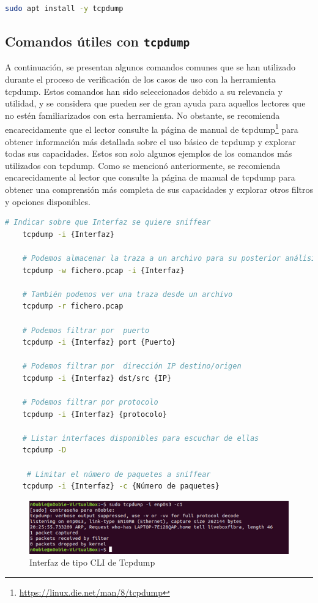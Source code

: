\begin{lstlisting}[language= bash, style=Consola2, caption={Instalación del paquete Tcpdump},label=code:tcpdump]
    sudo apt install -y tcpdump
\end{lstlisting}

\subsection{Comandos útiles con \texttt{tcpdump}}


A continuación, se presentan algunos comandos comunes que se han utilizado durante el proceso de verificación de los casos de uso con la herramienta tcpdump. Estos comandos han sido seleccionados debido a su relevancia y utilidad, y se considera que pueden ser de gran ayuda para aquellos lectores que no estén familiarizados con esta herramienta. No obstante, se recomienda encarecidamente que el lector consulte la página de manual de tcpdump\footnote{\url{https://linux.die.net/man/8/tcpdump}} para obtener información más detallada sobre el uso básico de tcpdump y explorar todas sus capacidades. Estos son solo algunos ejemplos de los comandos más utilizados con tcpdump. Como se mencionó anteriormente, se recomienda encarecidamente al lector que consulte la página de manual de tcpdump para obtener una comprensión más completa de sus capacidades y explorar otros filtros y opciones disponibles.

\begin{lstlisting}[language= bash, style=Consola2, caption={Comandos útiles con Tcpdump},label=code:tcpdump_use]
    # Indicar sobre que Interfaz se quiere sniffear
    tcpdump -i {Interfaz}
    
    # Podemos almacenar la traza a un archivo para su posterior análisis
    tcpdump -w fichero.pcap -i {Interfaz}
    
    # También podemos ver una traza desde un archivo
    tcpdump -r fichero.pcap
    
    # Podemos filtrar por  puerto
    tcpdump -i {Interfaz} port {Puerto}
    
    # Podemos filtrar por  dirección IP destino/origen
    tcpdump -i {Interfaz} dst/src {IP}
    
    # Podemos filtrar por protocolo
    tcpdump -i {Interfaz} {protocolo}
    
    # Listar interfaces disponibles para escuchar de ellas 
    tcpdump -D
    
     # Limitar el número de paquetes a sniffear
    tcpdump -i {Interfaz} -c {Número de paquetes}
\end{lstlisting}
\vspace{1cm}
\begin{figure}[ht]
    \centering
    \includegraphics[width=\textwidth]{archivos/img/anexos/tcpdump_cli_edited.png}
    \caption{Interfaz de tipo CLI de Tcpdump}
    \label{tcpdumpCli}
\end{figure}

